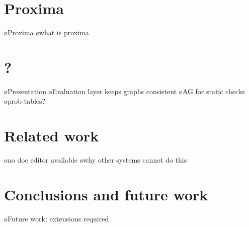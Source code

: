\documentclass[preprint,natbib]{sigplanconf}
\begin{document}
\section{Proxima}

\bl
\o Proxima
\o what is proxima
\el




\section{?}

\bl
\o Presentation
\o Evaluation layer keeps graphs consistent
\o AG for static checks
\o prob tables?
\el



\section{Related work}

\bl
\o no doc editor available
\o why other systems cannot do this
\el



\section{Conclusions and future work}

\bl
\o Future work: extensions required
\el






\end{document}
